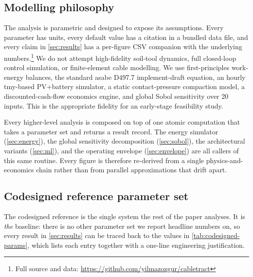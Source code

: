 \documentclass[11pt,a4paper]{article}
\newcommand{\cabletractrepo}{\url{https://github.com/yilmazozgur/cabletract}}
\begin{document}
\subsection{Modelling philosophy}\label{sec:philosophy}

The analysis is parametric and designed to expose its assumptions. Every parameter has units, every default value has a citation in a bundled data file, and every claim in \cref{sec:results} has a per-figure CSV companion with the underlying numbers.\footnote{Full source and data: \cabletractrepo} We do not attempt high-fidelity soil-tool dynamics, full closed-loop control simulation, or finite-element cable modelling. We use first-principles work-energy balances, the standard \gls{asabe} D497.7 implement-draft equation, an hourly \gls{tmy}-based PV+battery simulator, a static contact-pressure compaction model, a discounted-cash-flow economics engine, and global Sobol sensitivity over 20 inputs. This is the appropriate fidelity for an early-stage feasibility study.

Every higher-level analysis is composed on top of one atomic computation that takes a parameter set and returns a result record. The energy simulator (\cref{sec:energy}), the global sensitivity decomposition (\cref{sec:sobol}), the architectural variants (\cref{sec:ml}), and the operating envelope (\cref{sec:envelope}) are all callers of this same routine. Every figure is therefore re-derived from a single physics-and-economics chain rather than from parallel approximations that drift apart.

\subsection{Codesigned reference parameter set}\label{sec:codesigned-ref}

The codesigned reference is the single system the rest of the paper analyses. It is \emph{the} baseline: there is no other parameter set we report headline numbers on, so every result in \cref{sec:results} can be traced back to the values in \cref{tab:codesigned-params}, which lists each entry together with a one-line engineering justification.
\end{document}

